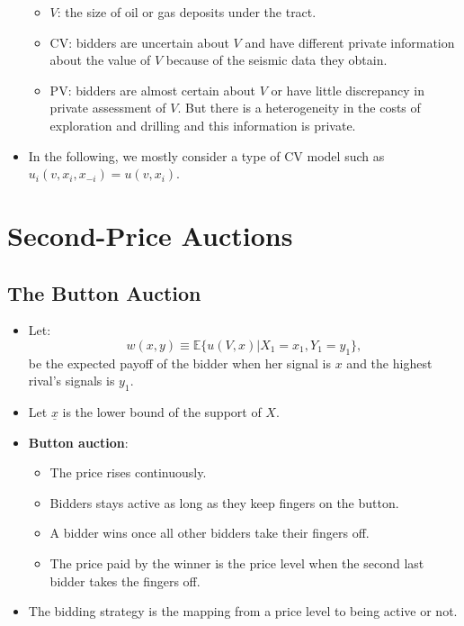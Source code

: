 \documentclass[]{book}
\providecommand{\tightlist}{%
  \setlength{\itemsep}{0pt}\setlength{\parskip}{0pt}}
\begin{document}
\begin{itemize}
  \begin{itemize}
  \tightlist
  \item
    \(V\): the size of oil or gas deposits under the tract.
  \item
    CV: bidders are uncertain about \(V\) and have different private
    information about the value of \(V\) because of the seismic data
    they obtain.
  \item
    PV: bidders are almost certain about \(V\) or have little
    discrepancy in private assessment of \(V\). But there is a
    heterogeneity in the costs of exploration and drilling and this
    information is private.
  \end{itemize}
\item
  In the following, we mostly consider a type of CV model such as
  \(u_i(v, x_i, x_{-i}) = u(v, x_i)\).
\end{itemize}

\section{Second-Price Auctions}\label{second-price-auctions}

\subsection{The Button Auction}\label{the-button-auction}

\begin{itemize}
\tightlist
\item
  Let: \[
  w(x, y) \equiv \mathbb{E}\{u(V, x)|X_1 = x_1, Y_1 = y_1\},
  \] be the expected payoff of the bidder when her signal is \(x\) and
  the highest rival's signals is \(y_1\).
\item
  Let \(\underline{x}\) is the lower bound of the support of \(X\).
\item
  \textbf{Button auction}:

  \begin{itemize}
  \tightlist
  \item
    The price rises continuously.
  \item
    Bidders stays active as long as they keep fingers on the button.
  \item
    A bidder wins once all other bidders take their fingers off.
  \item
    The price paid by the winner is the price level when the second last
    bidder takes the fingers off.
  \end{itemize}
\item
  The bidding strategy is the mapping from a price level to being active
  or not.
\end{itemize}
\end{document}
